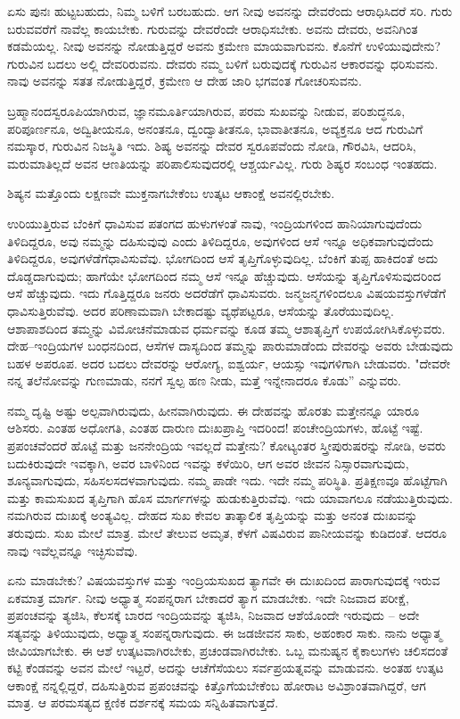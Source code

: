ಏಸು ಪುನಃ ಹುಟ್ಟಬಹುದು, ನಿಮ್ಮ ಬಳಿಗೆ ಬರಬಹುದು. ಆಗ ನೀವು ಅವನನ್ನು ದೇವರೆಂದು ಆರಾಧಿಸಿದರೆ ಸರಿ. ಗುರು ಬರುವವರೆಗೆ ನಾವೆಲ್ಲ ಕಾಯಬೇಕು. ಗುರುವನ್ನು ದೇವರೆಂದೇ ಆರಾಧಿಸಬೇಕು. ಅವನು ದೇವರು, ಅವನಿಗಿಂತ ಕಡಮೆಯಲ್ಲ. ನೀವು ಅವನನ್ನು ನೋಡುತ್ತಿದ್ದರೆ ಅವನು ಕ್ರಮೇಣ ಮಾಯವಾಗುವನು. ಕೊನೆಗೆ ಉಳಿಯುವುದೇನು? ಗುರುವಿನ ಬದಲು ಅಲ್ಲಿ ದೇವರಿರುವನು. ದೇವರು ನಮ್ಮ ಬಳಿಗೆ ಬರುವುದಕ್ಕೆ ಗುರುವಿನ ಆಕಾರವನ್ನು ಧರಿಸುವನು. ನಾವು ಅವನನ್ನು ಸತತ ನೋಡುತ್ತಿದ್ದರೆ, ಕ್ರಮೇಣ ಆ ದೇಹ ಜಾರಿ ಭಗವಂತ ಗೋಚರಿಸುವನು.

ಬ್ರಹ್ಮಾನಂದಸ್ವರೂಪಿಯಾಗಿರುವ, ಜ್ಞಾನಮೂರ್ತಿಯಾಗಿರುವ, ಪರಮ ಸುಖವನ್ನು ನೀಡುವ, ಪರಿಶುದ್ಧನೂ, ಪರಿಪೂರ್ಣನೂ, ಅದ್ವಿತೀಯನೂ, ಅನಂತನೂ, ದ್ವಂದ್ವಾತೀತನೂ, ಭಾವಾತೀತನೂ, ಅವ್ಯಕ್ತನೂ ಆದ ಗುರುವಿಗೆ ನಮಸ್ಕಾರ, ಗುರುವಿನ ನಿಜಸ್ಥಿತಿ ಇದು. ಶಿಷ್ಯ ಅವನನ್ನು ದೇವರ ಸ್ವರೂಪವೆಂದು ನೋಡಿ, ಗೌರವಿಸಿ, ಆದರಿಸಿ, ಮರುಮಾತಿಲ್ಲದೆ ಅವನ ಆಣತಿಯನ್ನು ಪರಿಪಾಲಿಸುವುದರಲ್ಲಿ ಆಶ್ಚರ್ಯವಿಲ್ಲ. ಗುರು ಶಿಷ್ಯರ ಸಂಬಂಧ ಇಂತಹದು.

ಶಿಷ್ಯನ ಮತ್ತೊಂದು ಲಕ್ಷಣವೇ ಮುಕ್ತನಾಗಬೇಕೆಂಬ ಉತ್ಕಟ ಆಕಾಂಕ್ಷೆ ಅವನಲ್ಲಿರಬೇಕು.

ಉರಿಯುತ್ತಿರುವ ಬೆಂಕಿಗೆ ಧಾವಿಸುವ ಪತಂಗದ ಹುಳುಗಳಂತೆ ನಾವು, ಇಂದ್ರಿಯಗಳಿಂದ ಹಾನಿಯಾಗುವುದೆಂದು ತಿಳಿದಿದ್ದರೂ, ಅವು ನಮ್ಮನ್ನು ದಹಿಸುವುವು ಎಂದು ತಿಳಿದಿದ್ದರೂ, ಅವುಗಳಿಂದ ಆಸೆ ಇನ್ನೂ ಅಧಿಕವಾಗುವುದೆಂದು ತಿಳಿದಿದ್ದರೂ, ಅವುಗಳೆಡೆಗೆ\break ಧಾವಿಸುವೆವು. ಭೋಗದಿಂದ ಆಸೆ ತೃಪ್ತಿಗೊಳ್ಳುವುದಿಲ್ಲ. ಬೆಂಕಿಗೆ ತುಪ್ಪ ಹಾಕಿದಂತೆ ಅದು ದೊಡ್ಡದಾಗುವುದು; ಹಾಗೆಯೇ ಭೋಗದಿಂದ ನಮ್ಮ ಆಸೆ ಇನ್ನೂ ಹೆಚ್ಚುವುದು. ಆಸೆಯನ್ನು ತೃಪ್ತಿಗೊಳಿಸುವುದರಿಂದ ಆಸೆ ಹೆಚ್ಚುವುದು. ಇದು ಗೊತ್ತಿದ್ದರೂ ಜನರು ಅದರೆಡೆಗೆ ಧಾವಿಸುವರು. ಜನ್ಮಜನ್ಮಗಳಿಂದಲೂ ವಿಷಯವಸ್ತುಗಳೆಡೆಗೆ ಧಾವಿಸುತ್ತಿರುವೆವು. ಅದರ ಪರಿಣಾಮವಾಗಿ ಬೇಕಾದಷ್ಟು ವ್ಯಥೆಪಟ್ಟರೂ, ಆಸೆಯನ್ನು ತೊರೆಯುವುದಿಲ್ಲ. ಆಶಾಪಾಶದಿಂದ ತಮ್ಮನ್ನು ವಿಮೋಚನೆಮಾಡುವ ಧರ್ಮವನ್ನು ಕೂಡ ತಮ್ಮ ಆಶಾತೃಪ್ತಿಗೆ ಉಪಯೋಗಿಸಿಕೊಳ್ಳುವರು. ದೇಹ–ಇಂದ್ರಿಯಗಳ ಬಂಧನದಿಂದ, ಆಸೆಗಳ ದಾಸ್ಯದಿಂದ ತಮ್ಮನ್ನು ಪಾರುಮಾಡೆಂದು ದೇವರನ್ನು ಅವರು ಬೇಡುವುದು ಬಹಳ ಅಪರೂಪ. ಅದರ ಬದಲು ದೇವರನ್ನು ಆರೋಗ್ಯ, ಐಶ್ವರ್ಯ, ಆಯಸ್ಸು ಇವುಗಳಿಗಾಗಿ ಬೇಡುವರು. "ದೇವರೇ ನನ್ನ ತಲೆನೋವನ್ನು ಗುಣಮಾಡು, ನನಗೆ ಸ್ವಲ್ಪ ಹಣ ನೀಡು, ಮತ್ತೆ ಇನ್ನೇನಾದರೂ ಕೊಡು'' ಎನ್ನುವರು.

ನಮ್ಮ ದೃಷ್ಟಿ ಅಷ್ಟು ಅಲ್ಪವಾಗಿರುವುದು, ಹೀನವಾಗಿರುವುದು. ಈ ದೇಹವನ್ನು ಹೊರತು ಮತ್ತೇನನ್ನೂ ಯಾರೂ ಆಶಿಸರು. ಎಂತಹ ಅಧೋಗತಿ, ಎಂತಹ ದಾರುಣ ದುಃಖಪ್ರಾಪ್ತಿ ಇದರಿಂದ! ಪಂಚೇಂದ್ರಿಯಗಳು, ಹೊಟ್ಟೆ ಇಷ್ಟೆ. ಪ್ರಪಂಚವೆಂದರೆ ಹೊಟ್ಟೆ ಮತ್ತು ಜನನೇಂದ್ರಿಯ ಇವಲ್ಲದೆ ಮತ್ತೇನು? ಕೋಟ್ಯಂತರ ಸ್ತ್ರೀಪುರುಷರನ್ನು ನೋಡಿ, ಅವರು ಬದುಕಿರುವುದೇ ಇವಕ್ಕಾಗಿ, ಅವರ ಬಾಳಿನಿಂದ ಇವನ್ನು ಕಳೆಯಿರಿ, ಆಗ ಅವರ ಜೀವನ ನಿಸ್ಸಾರವಾಗುವುದು, ಶೂನ್ಯವಾಗುವುದು, ಸಹಿಸಲಸದಳವಾಗುವುದು. ನಮ್ಮ ಪಾಡೇ ಇದು. ಇದೇ ನಮ್ಮ ಪರಿಸ್ಥಿತಿ. ಪ್ರತಿಕ್ಷಣವೂ ಹೊಟ್ಟೆಗಾಗಿ ಮತ್ತು ಕಾಮಸುಖದ ತೃಪ್ತಿಗಾಗಿ ಹೊಸ ಮಾರ್ಗಗಳನ್ನು ಹುಡುಕುತ್ತಿರುವೆವು. ಇದು ಯಾವಾಗಲೂ ನಡೆಯುತ್ತಿರುವುದು. ನಮಗಿರುವ ದುಃಖಕ್ಕೆ ಅಂತ್ಯವಿಲ್ಲ. ದೇಹದ ಸುಖ ಕೇವಲ ತಾತ್ಕಾಲಿಕ ತೃಪ್ತಿಯನ್ನು ಮತ್ತು ಅನಂತ ದುಃಖವನ್ನು ತರುವುದು. ಸುಖ ಮೇಲೆ ಮಾತ್ರ. ಮೇಲೆ ತೇಲುವ ಅಮೃತ, ಕೆಳಗೆ ವಿಷವಿರುವ ಪಾನೀಯವನ್ನು ಕುಡಿದಂತೆ. ಆದರೂ ನಾವು ಇವೆಲ್ಲವನ್ನೂ ಇಚ್ಛಿಸುವೆವು.

ಏನು ಮಾಡಬೇಕು? ವಿಷಯವಸ್ತುಗಳ ಮತ್ತು ಇಂದ್ರಿಯಸುಖದ ತ್ಯಾಗವೇ ಈ ದುಃಖದಿಂದ ಪಾರಾಗುವುದಕ್ಕೆ ಇರುವ ಏಕಮಾತ್ರ ಮಾರ್ಗ. ನೀವು ಅಧ್ಯಾತ್ಮ ಸಂಪನ್ನರಾಗ ಬೇಕಾದರೆ ತ್ಯಾಗ ಮಾಡಬೇಕು. ಇದೇ ನಿಜವಾದ ಪರೀಕ್ಷೆ, ಪ್ರಪಂಚವನ್ನು ತ್ಯಜಿಸಿ, ಕೆಲಸಕ್ಕೆ ಬಾರದ ಇಂದ್ರಿಯವನ್ನು ತ್ಯಜಿಸಿ, ನಿಜವಾದ ಆಶೆಯೊಂದೇ ಇರುವುದು – ಅದೇ ಸತ್ಯವನ್ನು ತಿಳಿಯುವುದು, ಅಧ್ಯಾತ್ಮ ಸಂಪನ್ನರಾಗುವುದು. ಈ ಜಡಜೀವನ ಸಾಕು, ಅಹಂಕಾರ ಸಾಕು. ನಾನು ಅಧ್ಯಾತ್ಮ ಜೀವಿಯಾಗಬೇಕು. ಈ ಆಶೆ ಉತ್ಕಟವಾಗಿರಬೇಕು, ಪ್ರಚಂಡವಾಗಿರಬೇಕು. ಒಬ್ಬ ಮನುಷ್ಯನ ಕೈಕಾಲುಗಳು ಚಲಿಸದಂತೆ ಕಟ್ಟಿ ಕೆಂಡವನ್ನು ಅವನ ಮೇಲೆ ಇಟ್ಟರೆ, ಅದನ್ನು ಆಚೆಗೆಸೆಯಲು ಸರ್ವಪ್ರಯತ್ನವನ್ನು ಮಾಡುವನು. ಅಂತಹ ಉತ್ಕಟ ಆಕಾಂಕ್ಷೆ ನನ್ನಲ್ಲಿದ್ದರೆ, ದಹಿಸುತ್ತಿರುವ ಪ್ರಪಂಚವನ್ನು ಕಿತ್ತೊಗೆಯಬೇಕೆಂಬ ಹೋರಾಟ ಅವಿಶ್ರಾಂತವಾಗಿದ್ದರೆ, ಆಗ ಮಾತ್ರ. ಆ ಪರಮಸತ್ಯದ ಕ್ಷಣಿಕ ದರ್ಶನಕ್ಕೆ ಸಮಯ ಸನ್ನಿಹಿತವಾಗುತ್ತದೆ.

